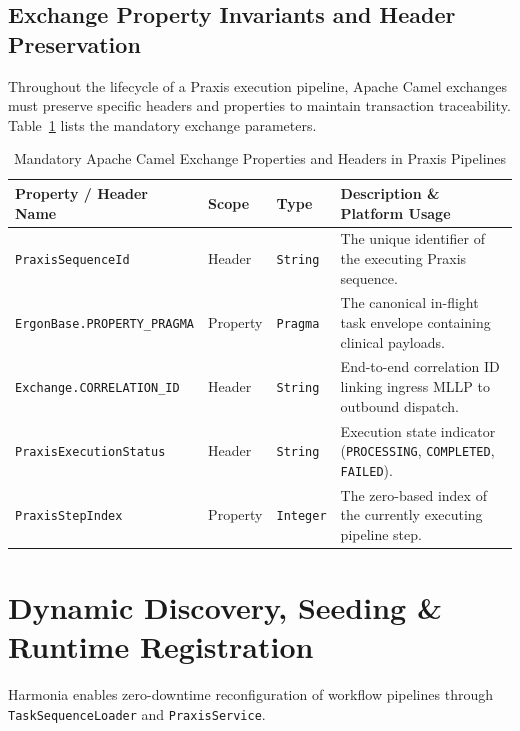 \subsection{Exchange Property Invariants and Header Preservation}
\label{subsec:routing_invariants}

Throughout the lifecycle of a Praxis execution pipeline, Apache Camel exchanges must preserve specific headers and properties to maintain transaction traceability. Table~\ref{tab:praxis_exchange_properties} lists the mandatory exchange parameters.

\begin{table}[htbp]
\centering
\small
\begin{tabularx}{\textwidth}{l l p{2.2cm} X}
\toprule
\textbf{Property / Header Name} & \textbf{Scope} & \textbf{Type} & \textbf{Description \& Platform Usage} \\
\midrule
\texttt{PraxisSequenceId} & Header & \texttt{String} & The unique identifier of the executing Praxis sequence. \\
\texttt{ErgonBase.PROPERTY\_PRAGMA} & Property & \texttt{Pragma} & The canonical in-flight task envelope containing clinical payloads. \\
\texttt{Exchange.CORRELATION\_ID} & Header & \texttt{String} & End-to-end correlation ID linking ingress MLLP to outbound dispatch. \\
\texttt{PraxisExecutionStatus} & Header & \texttt{String} & Execution state indicator (\texttt{PROCESSING}, \texttt{COMPLETED}, \texttt{FAILED}). \\
\texttt{PraxisStepIndex} & Property & \texttt{Integer} & The zero-based index of the currently executing pipeline step. \\
\bottomrule
\end{tabularx}
\caption{Mandatory Apache Camel Exchange Properties and Headers in Praxis Pipelines}
\label{tab:praxis_exchange_properties}
\end{table}

\section{Dynamic Discovery, Seeding \& Runtime Registration}
\label{sec:praxis_discovery_seeding}

Harmonia enables zero-downtime reconfiguration of workflow pipelines through \texttt{TaskSequenceLoader} and \texttt{PraxisService}.

